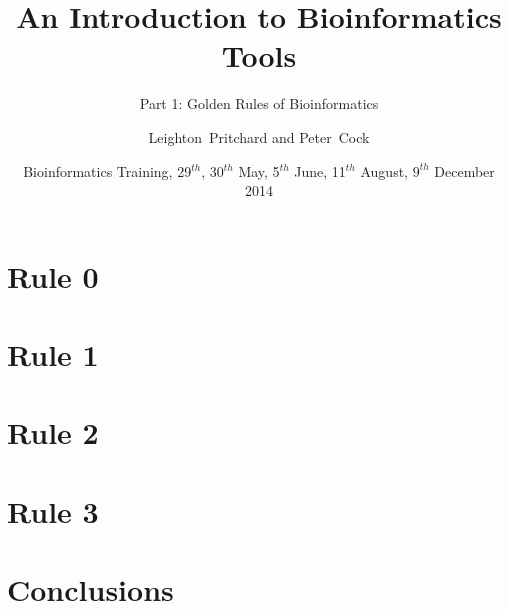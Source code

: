 
%



\title[Intro to Bioinformatics] %
{An Introduction to Bioinformatics Tools}
\subtitle{Part 1: Golden Rules of Bioinformatics}
\author[Pritchard, Cock] %
{Leighton~Pritchard and Peter~Cock}
\date[May, June, August, December 2014] %
{Bioinformatics Training, 29$^{th}$, 30$^{th}$ May, 5$^{th}$ June, 11$^{th}$ August, $9^{th}$ December 2014}
\subject{Bioinformatics}





\frame[plain]{\titlepage}
  
%
    
\section{Rule 0}
  

\section{Rule 1}
  
    

\section{Rule 2}
  
    

\section{Rule 3}
  
    

%


\section{Conclusions}
    

